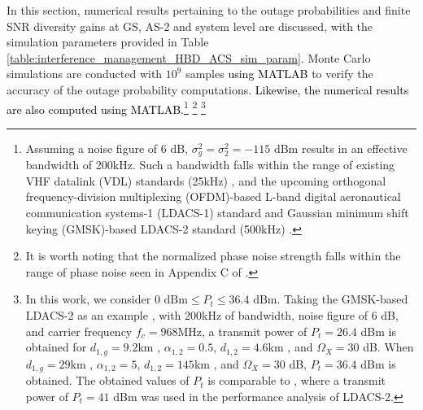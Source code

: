 \begin{table}[]
\centering
\caption{Simulation Parameters} \vspace{0.1cm}
\label{table:interference_management_HBD_ACS_sim_param}
\end{table}

In this section, numerical results pertaining to the outage probabilities and finite SNR diversity gains at GS, AS-2 and system level are discussed, with the simulation parameters provided in Table \ref{table:interference_management_HBD_ACS_sim_param}. Monte Carlo simulations are conducted with $10^{9}$ samples \textcolor{black}{using MATLAB} to verify the accuracy of the outage probability computations. \textcolor{black}{Likewise, the numerical results are also computed using MATLAB}.\footnote{Assuming a noise figure of $6$ dB, $\sigma_g^2 = \sigma_2^2=-115$ dBm results in an effective bandwidth of 200kHz. Such a bandwidth falls within the range of existing VHF datalink (VDL) standards (25kHz) \cite[Table 3.16]{stacey2008aeronautical}, and the upcoming orthogonal frequency-division multiplexing (OFDM)-based L-band digital aeronautical communication systems-1 (LDACS-1) standard \cite{jamal2017fbmc,gligorevic2011ldacs1} and Gaussian minimum shift keying (GMSK)-based LDACS-2 standard (500kHz) \cite{jamal2017fbmc}.} \footnote{It is worth noting that the normalized phase noise strength falls within the range of phase noise seen in Appendix C of \cite{sahai2013impact}.} \footnote{In this work, we consider $0\text{ dBm} \leq P_t \leq 36.4\text{ dBm}$. Taking the GMSK-based LDACS-2 as an example \cite{jamal2017fbmc}, with 200kHz of bandwidth, noise figure of 6 dB, and carrier frequency $f_c = 968$MHz, a transmit power of $P_t = 26.4$ dBm is obtained for $d_{1,g}=9.2$km \cite{matolak2017air_suburban}, $\alpha_{1,2}=0.5$, $d_{1,2}=4.6$km \cite{caas2014manual}, and $\Omega_X = 30$ dB. When $d_{1,g}=29$km \cite{matolak2017air_suburban}, $\alpha_{1,2}=5$, $d_{1,2}=145$km \cite{caas2014manual}, and $\Omega_X = 30$ dB, $P_t = 36.4$ dBm is obtained. The obtained values of $P_t$ is comparable to \cite{jamal2017fbmc}, where a transmit power of $P_t=41$ dBm was used in the performance analysis of LDACS-2.}

